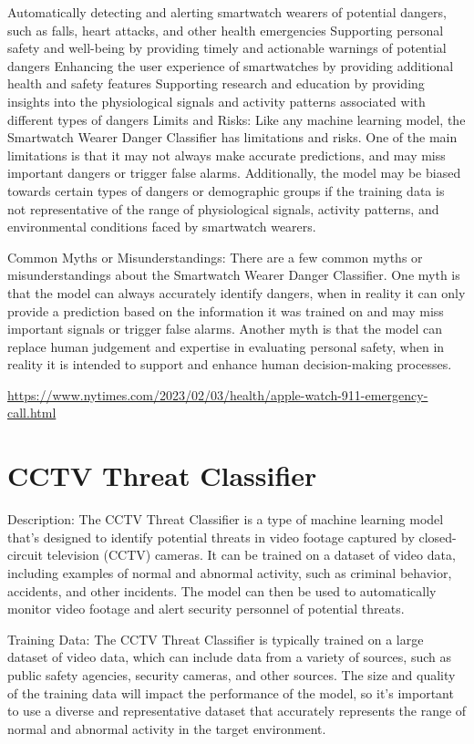 Automatically detecting and alerting smartwatch wearers of potential dangers, such as falls, heart attacks, and other health emergencies
Supporting personal safety and well-being by providing timely and actionable warnings of potential dangers
Enhancing the user experience of smartwatches by providing additional health and safety features
Supporting research and education by providing insights into the physiological signals and activity patterns associated with different types of dangers
Limits and Risks:
Like any machine learning model, the Smartwatch Wearer Danger Classifier has limitations and risks. One of the main limitations is that it may not always make accurate predictions, and may miss important dangers or trigger false alarms. Additionally, the model may be biased towards certain types of dangers or demographic groups if the training data is not representative of the range of physiological signals, activity patterns, and environmental conditions faced by smartwatch wearers.

Common Myths or Misunderstandings:
There are a few common myths or misunderstandings about the Smartwatch Wearer Danger Classifier. One myth is that the model can always accurately identify dangers, when in reality it can only provide a prediction based on the information it was trained on and may miss important signals or trigger false alarms. Another myth is that the model can replace human judgement and expertise in evaluating personal safety, when in reality it is intended to support and enhance human decision-making processes.

\url{https://www.nytimes.com/2023/02/03/health/apple-watch-911-emergency-call.html}

\section{CCTV Threat Classifier}

Description:
The CCTV Threat Classifier is a type of machine learning model that's designed to identify potential threats in video footage captured by closed-circuit television (CCTV) cameras. It can be trained on a dataset of video data, including examples of normal and abnormal activity, such as criminal behavior, accidents, and other incidents. The model can then be used to automatically monitor video footage and alert security personnel of potential threats.

Training Data:
The CCTV Threat Classifier is typically trained on a large dataset of video data, which can include data from a variety of sources, such as public safety agencies, security cameras, and other sources. The size and quality of the training data will impact the performance of the model, so it's important to use a diverse and representative dataset that accurately represents the range of normal and abnormal activity in the target environment.

